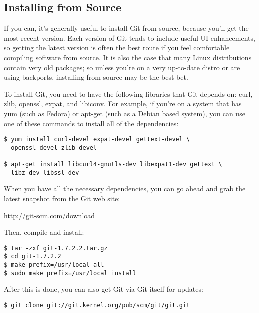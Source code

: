 \documentclass[a4paper]{book}
\newcounter{tab}[chapter]
\begin{document}
\subsection{Installing from Source}\label{installing-from-source}

If you can, it's generally useful to install Git from source, because you'll get the most recent version. Each version of Git tends to include useful UI enhancements, so getting the latest version is often the best route if you feel comfortable compiling software from source. It is also the case that many Linux distributions contain very old packages; so unless you're on a very up-to-date distro or are using backports, installing from source may be the best bet.

To install Git, you need to have the following libraries that Git depends on: curl, zlib, openssl, expat, and libiconv. For example, if you're on a system that has yum (such as Fedora) or apt-get (such as a Debian based system), you can use one of these commands to install all of the dependencies:

\begin{shaded}\begin{verbatim}
$ yum install curl-devel expat-devel gettext-devel \
  openssl-devel zlib-devel

$ apt-get install libcurl4-gnutls-dev libexpat1-dev gettext \
  libz-dev libssl-dev
\end{verbatim}\end{shaded}

When you have all the necessary dependencies, you can go ahead and grab the latest snapshot from the Git web site:

\url{http://git-scm.com/download}

Then, compile and install:

\begin{shaded}\begin{verbatim}
$ tar -zxf git-1.7.2.2.tar.gz
$ cd git-1.7.2.2
$ make prefix=/usr/local all
$ sudo make prefix=/usr/local install
\end{verbatim}\end{shaded}

After this is done, you can also get Git via Git itself for updates:

\begin{shaded}\begin{verbatim}
$ git clone git://git.kernel.org/pub/scm/git/git.git
\end{verbatim}\end{shaded}
\end{document}
